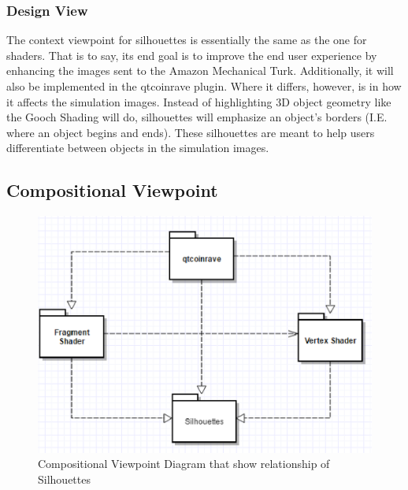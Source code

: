 ﻿\documentclass[10pt,journal,compsoc,draftclsnofoot]{IEEEtran}
\begin{document}
\begin{flushleft}
\subsubsection{Design View}
The context viewpoint for silhouettes is essentially the same as the one for shaders.
That is to say, its end goal is to improve the end user experience by enhancing the images sent to the Amazon Mechanical Turk.
Additionally, it will also be implemented in the qtcoinrave plugin.
Where it differs, however, is in how it affects the simulation images.
Instead of highlighting 3D object geometry like the Gooch Shading will do, silhouettes will emphasize an object's borders (I.E. where an object begins and ends).
These silhouettes are meant to help users differentiate between objects in the simulation images.

\subsection{Compositional Viewpoint}

\begin{figure} [H]
  \includegraphics[scale=0.9]{Silhouettes_composition.eps}
  \caption
{ \newline \hspace{\linewidth}
Compositional Viewpoint Diagram that show relationship of Silhouettes}
  \label{fig:Silhouettes_composition}
\end{figure}


\end{flushleft}
\end{document}
